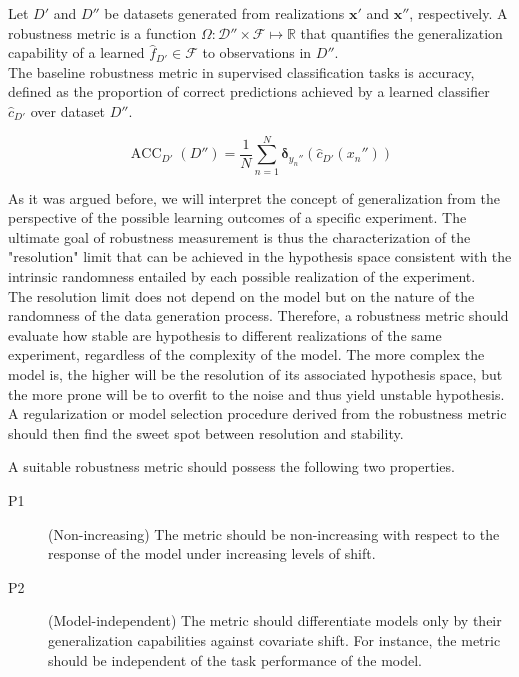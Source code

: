 \begin{definition}
    Let $D'$ and $D''$ be datasets generated from realizations $\bm{x}'$ and $\bm{x}''$,
    respectively. 
    A robustness metric is a function $\Omega: \mathcal{D}'' \times \mathcal{F} \longmapsto \mathbb{R}$ 
    that quantifies the generalization
    capability of a learned $\hat{f}_{D'} \in \mathcal{F}$ to observations in $D''$. \\

    The baseline robustness metric in supervised classification tasks is
    accuracy, defined as the proportion of correct predictions 
    achieved by a learned classifier $\hat{c}_{D'}$ over 
    dataset $D''$.

    $$
    \operatorname{ACC}_{D'}(D'') = \frac{1}{N} \sum_{n=1}^N \bm{\delta}_{y_n''} \left ( \hat{c}_{D'}(x_n'') \right )
    $$

\end{definition}

As it was argued before, we will 
interpret the concept of generalization from the 
perspective of the possible learning outcomes
of a specific experiment. The ultimate goal 
of robustness measurement is thus the characterization of the "resolution" 
limit that can be achieved in the hypothesis space 
consistent with the intrinsic randomness entailed by each 
possible realization of the experiment. \\

The resolution limit does not depend on the model but on the 
nature of the randomness of the data generation process. 
Therefore, a robustness metric should evaluate how stable are hypothesis 
to different realizations of the same experiment, regardless 
of the complexity of the model. The more 
complex the model is, the higher will be the resolution of its
associated hypothesis space, but the more prone will be to overfit
to the noise and thus yield unstable hypothesis. A regularization 
or model selection procedure derived from the robustness metric 
should then find the sweet spot between resolution and stability. \\

\begin{properties}\label{properties:robustness}
    A suitable robustness metric should possess the following two properties. 
    \cite{buhmannPosteriorAgreementModel2022}
\begin{description}
    \item[P1](Non-increasing) The metric should be non-increasing with respect to the
    response of the model under increasing levels of shift.
    \item[P2](Model-independent) The metric should differentiate models only by their generalization capabilities against 
    covariate shift. For instance, the metric should be independent of the task
    performance of the model.
\end{description}
\end{properties}

